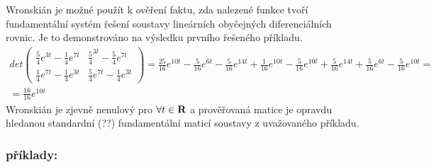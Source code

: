 Wronskián je možné použít k ověření faktu, zda nalezené funkce tvoří fundamentální systém řešení soustavy lineárních obyčejných diferenciálních rovnic. Je to demonstrováno na výsledku prvního řešeného příkladu.
\begin{equation*}
 \begin{array}{l}
    det\left( \begin{array}{cc} \frac{5}{4}e^{3t} - \frac{1}{4}e^{7t} & \frac{5}{4}^{3t} - \frac{5}{4}e^{7t} \\ \frac{1}{4}e^{7t} - \frac{1}{4}e^{3t} & \frac{5}{4}e^{7t} - \frac{1}{4}e^{3t}  \end{array}\right) = \frac{25}{16}e^{10t} - \frac{5}{16}e^{6t} - \frac{5}{16}e^{14t} + \frac{1}{16}e^{10t} - \frac{5}{16}e^{10t} +\frac{5}{16}e^{14t} + \frac{5}{16}e^{6t} - \frac{5}{16}e^{10t} = \\
    = \frac{16}{16}e^{10t}
  \end{array}
\end{equation*}
Wronskián je zjevně nenulový pro $\forall t \in {\bf R}$ a prověřovaná matice je opravdu hledanou standardní (??) fundamentální maticí soustavy z uvažovaného příkladu.

\subsubsection{příklady:}

